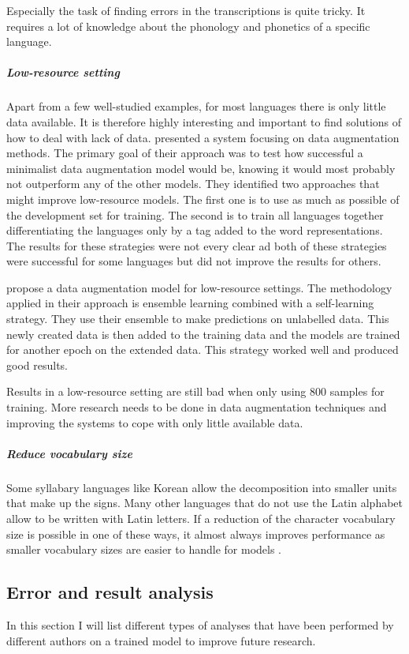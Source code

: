 Especially the task of finding errors in the transcriptions is quite tricky. It requires a lot of knowledge about the phonology and phonetics of a specific language. 

\subparagraph{Low-resource setting}
Apart from a few well-studied examples, for most languages there is only little data available. It is therefore highly interesting and important to find solutions of how to deal with lack of data. \cite{hammond-2021-data} presented a system focusing on data augmentation methods. The primary goal of their approach was to test how successful a minimalist data augmentation model would be, knowing it would most probably not outperform any of the other models. They identified two approaches that might improve low-resource models. The first one is to use as much as possible of the development set for training. The second is to train all languages together differentiating the languages only by a tag added to the word representations. The results for these strategies were not every clear ad both of these strategies were successful for some languages but did not improve the results for others.

\citet{yu-etal-2020} propose a data augmentation model for low-resource settings. The methodology applied in their approach is ensemble learning combined with a self-learning strategy. They use their ensemble to make predictions on unlabelled data. This newly created data is then added to the training data and the models are trained for another epoch on the extended data. This strategy worked well and produced good results. 

Results in a low-resource setting are still bad when only using 800 samples for training. More research needs to be done in data augmentation techniques and improving the systems to cope with only little available data.

\subparagraph{Reduce vocabulary size}
Some syllabary languages like Korean allow the decomposition into smaller units that make up the signs. Many other languages that do not use the Latin alphabet allow to be written with Latin letters. If a reduction of the character vocabulary size is possible in one of these ways, it almost always improves performance as smaller vocabulary sizes are easier to handle for models \citep{gorman-etal-2020-sigmorphon}. 


\subsection{Error and result analysis}
In this section I will list different types of analyses that have been performed by different authors on a trained model to improve future research.

